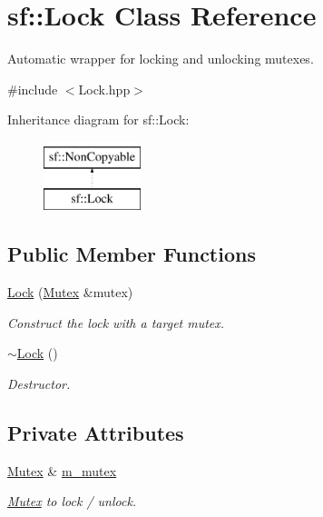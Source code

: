 \hypertarget{classsf_1_1_lock}{}\section{sf\+:\+:Lock Class Reference}
\label{classsf_1_1_lock}


Automatic wrapper for locking and unlocking mutexes.  




{\ttfamily \#include $<$Lock.\+hpp$>$}

Inheritance diagram for sf\+:\+:Lock\+:\begin{figure}[H]
\begin{center}
\leavevmode
\includegraphics[height=2.000000cm]{classsf_1_1_lock}
\end{center}
\end{figure}
\subsection*{Public Member Functions}
\begin{DoxyCompactItemize}
\item 
\mbox{\hyperlink{classsf_1_1_lock_a1a4c5d7a15da61103d85c9aa7f118920}{Lock}} (\mbox{\hyperlink{classsf_1_1_mutex}{Mutex}} \&mutex)
\begin{DoxyCompactList}\small\item\em Construct the lock with a target mutex. \end{DoxyCompactList}\item 
\mbox{\hyperlink{classsf_1_1_lock_a8168b36323a18ccf5b6bc531d964aec5}{$\sim$\+Lock}} ()
\begin{DoxyCompactList}\small\item\em Destructor. \end{DoxyCompactList}\end{DoxyCompactItemize}
\subsection*{Private Attributes}
\begin{DoxyCompactItemize}
\item 
\mbox{\label{classsf_1_1_lock_a09ac17cbb8c83d6094d3935164742967}} 
\mbox{\hyperlink{classsf_1_1_mutex}{Mutex}} \& \mbox{\hyperlink{classsf_1_1_lock_a09ac17cbb8c83d6094d3935164742967}{m\+\_\+mutex}}
\begin{DoxyCompactList}\small\item\em \mbox{\hyperlink{classsf_1_1_mutex}{Mutex}} to lock / unlock. \end{DoxyCompactList}\end{DoxyCompactItemize}
